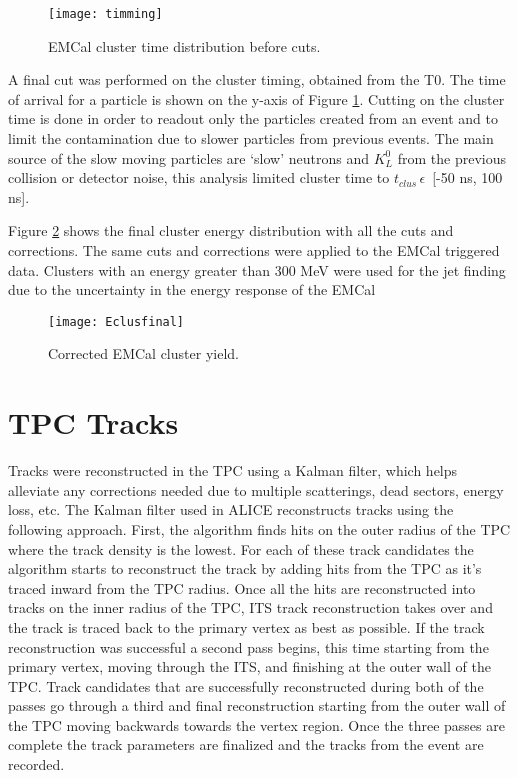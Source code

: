 \begin{figure}[!h]
\texttt{[image: timming]}
\centering
\caption{EMCal cluster time distribution before cuts.}
\label{fig:EMCaltime}
\end{figure}

A final cut was performed on the cluster timing, obtained from the T0.  The time of arrival for a particle is shown on the y-axis of Figure \ref{fig:EMCaltime}.  Cutting on the cluster time is done in order to readout only the particles created from an event and to limit the contamination due to slower particles from previous events.  The main source of the slow moving particles are `slow' neutrons and $K_{L}^{0}$ from the previous collision or detector noise, this analysis limited cluster time to $t_{clus} \, \epsilon \,$ [-50 ns, 100 ns].

Figure \ref{fig:EMCalfinal} shows the final cluster energy distribution with all the cuts and corrections.  The same cuts and corrections were applied to the EMCal triggered data.  Clusters with an energy greater than 300 MeV were used for the jet finding due to the uncertainty in the energy response of the EMCal

\begin{figure}[h]
\texttt{[image: Eclusfinal]}
\centering
\caption{Corrected EMCal cluster yield.}
\label{fig:EMCalfinal}
\end{figure}
\newpage

\section{TPC Tracks}

Tracks were reconstructed in the TPC using a Kalman filter, which helps alleviate any corrections needed due to multiple scatterings, dead sectors, energy loss, etc.  The Kalman filter used in ALICE reconstructs tracks using the following approach.  First, the algorithm finds hits on the outer radius of the TPC where the track density is the lowest.  For each of these track candidates the algorithm starts to reconstruct the track by adding hits from the TPC as it's traced inward from the TPC radius.   Once all the hits are reconstructed into tracks on the inner radius of the TPC, ITS track reconstruction takes over and the track is traced back to the primary vertex as best as possible.  If the track reconstruction was successful a second pass begins, this time starting from the primary vertex, moving through the ITS, and finishing at the outer wall of the TPC.  Track candidates that are successfully reconstructed during both of the passes go through a third and final reconstruction starting from the outer wall of the TPC moving backwards towards the vertex region.  Once the three passes are complete the track parameters are finalized and the tracks from the event are recorded. 

